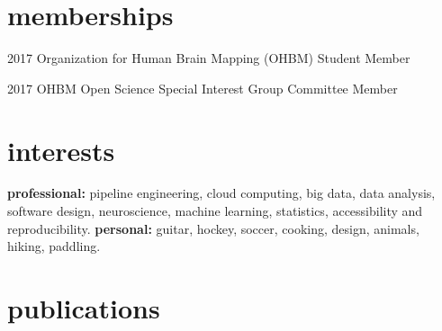 \documentclass[]{friggeri-cv} %
\begin{document}
\section{memberships}

\begin{entrylist}
\vspace{-7pt}
\entry
{2017}
{Organization for Human Brain Mapping (OHBM)}
{Student Member}
{}
\vspace{-7pt}

\entry
{2017}
{OHBM Open Science Special Interest Group}
{Committee Member}
{}
\vspace{-7pt}
\end{entrylist}

\vspace{9pt}
\section{interests}

\textbf{professional:} pipeline engineering, cloud computing, big data, data analysis,
software design, neuroscience, machine learning, statistics, accessibility and reproducibility.
\textbf{personal:} guitar, hockey, soccer, cooking, design, animals, hiking, paddling.


\section{publications}






\end{document}

